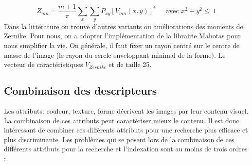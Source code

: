 \begin{equation}
Z_{mn} = \frac{m+1}{\pi} \sum_{x} \sum_{y} P_{xy}[V_{mn}(x,y)]^{*} ~~~~~\mbox{ avec $x^{2} + y^{2} \leq ~1$}
\end{equation}
Dans la littérature on trouve d'autres variants ou améliorations des moments de Zernike. Pour nous, on a adopter l'implémentation de la librairie Mahotas pour nous simplifier la vie. On générale, il faut fixer un rayon centré sur le centre de masse de l'image (le rayon du cercle enveloppant minimal de la forme).
Le vecteur de caractéristiques $ V_{Zernike} $ et de taille 25.

\subsection{Combinaison des descripteurs}
Les attributs: couleur, texture, forme décrivent les images par leur contenu visuel. La combinaison de ces attributs peut caractériser mieux le contenu. Il est donc intéressant de
combiner ces différents attributs pour une recherche plus efficace et plus discriminante. Les problèmes qui se posent lors de la combinaison de ces différents attributs pour la recherche et l’indexation sont au moins de trois ordres :

